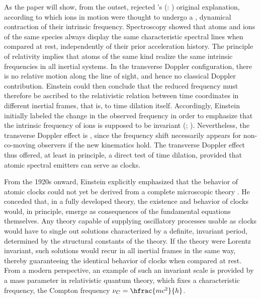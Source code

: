 \documentclass[pdflatex,sn-basic]{sn-jnl}
\newcommand{\tDe}{transverse Doppler effect\xspace}
\renewcommand{\citets}[2][]{\citeauthor{#2}'s (\citeyear{#2}\if\relax\detokenize{#1}\relax\else: #1\fi)}
\begin{document}

As the paper will show, from the outset, \citet{Einstein1907d} rejected \citets{Stark1906} original explanation, according to which ions in motion were thought to undergo a , dynamical contraction of their intrinsic frequency. Spectroscopy showed that atoms and ions of the same species always display the same characteristic spectral lines when compared at rest, independently of their prior acceleration history. The principle of relativity implies that atoms of the same kind realize the same intrinsic frequencies in all inertial systems. In the transverse Doppler configuration, there is no relative motion along the line of sight, and hence no classical Doppler contribution. Einstein could then conclude that the reduced frequency must therefore be ascribed to the relativistic relation between time coordinates in different inertial frames, that is, to time dilation itself. Accordingly, Einstein initially labeled the change in the observed frequency  in order to emphasize that the intrinsic frequency of ions is supposed to be invariant (\cite[422]{Einstein1908}; \cite[133]{Einstein1910}). Nevertheless, the \tDe is , since the frequency shift necessarily appears for non-co-moving observers if the new kinematics hold. The transverse Doppler effect thus offered, at least in principle, a direct test of time dilation, provided that atomic spectral emitters can serve as  clocks.

From the 1920s onward, Einstein explicitly emphasized that the behavior of atomic clocks could not yet be derived from a complete microscopic theory \citep{Einstein1921,Einstein1923,Einstein1924,Einstein1926,Einstein1949}. He conceded that, in a fully developed theory, the existence and behavior of clocks would, in principle, emerge as consequences of the fundamental equations themselves. Any theory capable of supplying oscillatory processes usable as clocks would have to single out solutions characterized by a definite, invariant period, determined by the structural constants of the theory. If the theory were Lorentz invariant, such solutions would recur in all inertial frames in the same way, thereby guaranteeing the identical behavior of clocks when compared at rest. From a modern perspective, an example of such an invariant scale is provided by a mass parameter in relativistic quantum theory, which fixes a characteristic frequency, the Compton frequency $\nu_C=\hfrac{mc^2}{h}$.  
\end{document}

